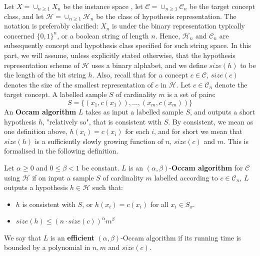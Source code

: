 Let $X= \cup_{n\geq 1} X_n$ be the instance space , let $\mathcal{C}=\cup_{n\geq 1}\mathcal{C}_{n}$ be the target concept class, and let $\mathcal{H}= \cup_{n\geq 1}\mathcal{H}_{n}$ be the class of hypothesis representation. The notation is preferably clarified: $X_{n}$ is under the binary representation typically concerned $\{0,1\}^{n}$, or a boolean string of length $n$. Hence, $\mathcal{H}_{n}$ and $\mathcal{C}_{n}$ are subsequently concept and hypothesis class specified for such string space. In this part, we will assume, unless explicitly stated otherwise, that the hypothesis representation scheme of $\mathcal{H}$ uses a binary alphabet, and we define $size(h)$ to be the length of the bit string $h$. Also, recall that for a concept $c\in \mathcal{C}$, $size(c)$ denotes the size of the smallest representation of $c$ in $\mathcal{H}$. Let $c\in \mathcal{C}_{n}$ denote the target concept. A labelled sample $S$ of cardinality $m$ is a set of pairs: 
\begin{equation*}
    S = \{(x_1, c(x_1)),\dots,(x_m, c(x_m))\}
\end{equation*}
An \textbf{Occam algorithm} $L$ takes as input a labelled sample $S$, and outputs a short hypothesis $h$, "relatively so", that is consistent with $S$. By consistent, we mean as one definition above, $h(x_{i})= c(x_{i})$ for each $i$, and for short we mean that $size(h)$ is a sufficiently slowly growing function of $n$, $size(c)$ and $m$. This is formalised in the following definition. 

\begin{definition}
    Let $\alpha \geq 0$ and $0\leq \beta < 1$ be constant. $L$ is an $(\alpha, \beta)$-\textbf{Occam algorithm} for $\mathcal{C}$ using $\mathcal{H}$ if on input a sample $S$ of cardinality $m$ labelled according to $c\in \mathcal{C}_{n}$, $L$ outputs a hypothesis $h\in \mathcal{H}$ such that: 
    \begin{itemize}
        \item $h$ is consistent with $S$, or $h(x_{i})=c(x_i)$ for all $x_{i}\in S_{x}$. 
        \item $size(h)\leq (n\cdot size(c))^{\alpha}m^{\beta}$
    \end{itemize}
    We say that $L$ is an \textbf{efficient} $(\alpha,\beta)$-Occam algorithm if its running time is bounded by a polynomial in $n,m$ and $size(c)$.  
\end{definition}

